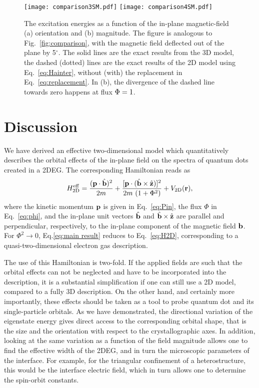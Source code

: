 \documentclass[aps,floatfix,twocolumn,showpacs,10pt,nofootinbib]{revtex4-1}
\newcommand{\be}{\begin{equation}}
\newcommand{\ee}{\end{equation}}
\begin{document}
\begin{figure}
\texttt{[image: comparison3SM.pdf]}
\texttt{[image: comparison4SM.pdf]}
\caption{\label{fig:compar_add}
The excitation energies as a function of the in-plane magnetic-field (a) orientation and (b) magnitude. The figure is analogous to Fig.~\ref{fig:comparison}, with the magnetic field deflected out of the plane by 5$^\circ$. The solid lines are the exact results from the 3D model, the dashed (dotted) lines are the exact results of the 2D model using Eq.~\eqref{eq:Hainter}, without (with) the replacement in Eq.~\eqref{eq:replacement}. In (b), the divergence of the dashed line towards zero happens at flux $\Phi=1$. }
\end{figure}

\section{Discussion}

\label{sec:discussion}

We have derived an effective two-dimensional model which quantitatively describes the orbital effects of the in-plane field on the spectra of quantum dots created in a 2DEG. The corresponding Hamiltonian reads as
\be
H_{\rm 2D}^{\rm eff} = \frac{(\Pin \cdot \Binunit )^2}{2m} +\frac{[\Pin \cdot (\Binunit \times \z ) ]^2}{2m \,\, (1+\Phi^2)} +V_{\rm 2D}(\Rin),
\label{eq:main result}
\ee
where the kinetic momentum $\textbf{p}$ is given in Eq.~\eqref{eq:Pin}, the flux $\Phi$ in Eq.~\eqref{eq:phi}, and the in-plane unit vectors $\hat{\textbf{b}}$ and $\hat{\textbf{b}} \times \hat{\textbf{z}} $ are parallel and perpendicular, respectively, to the in-plane component of the magnetic field $\textbf{b}$. For $\Phi^2 \to 0$, Eq.\eqref{eq:main result} reduces to Eq.~\eqref{eq:H2D}, corresponding to a quasi-two-dimensional electron gas description.

The use of this Hamiltonian is two-fold. If the applied fields are such that the orbital effects can not be neglected and have to be incorporated into the description, it is a substantial simplification if one can still use a 2D model, compared to a fully 3D description. On the other hand, and certainly more importantly, these effects should be taken as a tool to probe quantum dot and its single-particle orbitals. As we have demonstrated, the directional variation of the eigenstate energy gives  direct access to the corresponding orbital shape, that is the size and the orientation with respect to the crystallographic axes. In addition, looking at the same variation as a function of the field magnitude allows one to find the  effective width of the 2DEG, and in turn the microscopic parameters of the interface. For example, for the triangular confinement of a heterostructure, this would be the interface electric field, which in turn allows one to determine the spin-orbit constants.
\end{document}
